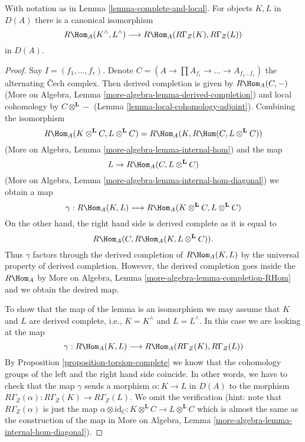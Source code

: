 \begin{lemma}
\label{lemma-compare-RHom}
With notation as in Lemma \ref{lemma-complete-and-local}.
For objects $K, L$ in $D(A)$ there is a canonical isomorphism
$$
R\Hom_A(K^\wedge, L^\wedge) \longrightarrow R\Hom_A(R\Gamma_Z(K), R\Gamma_Z(L))
$$
in $D(A)$.
\end{lemma}

\begin{proof}
Say $I = (f_1, \ldots, f_r)$. Denote
$C = (A \to \prod A_{f_i} \to \ldots \to A_{f_1 \ldots f_r})$ the
alternating {\v C}ech complex. Then derived completion is given by
$R\Hom_A(C, -)$ (More on Algebra, Lemma
\ref{more-algebra-lemma-derived-completion}) and local cohomology by
$C \otimes^\mathbf{L} -$ (Lemma \ref{lemma-local-cohomology-adjoint}).
Combining the isomorphism
$$
R\Hom_A(K \otimes^\mathbf{L} C, L \otimes^\mathbf{L} C) =
R\Hom_A(K, R\Hom(C,  L \otimes^\mathbf{L} C))
$$
(More on Algebra, Lemma \ref{more-algebra-lemma-internal-hom})
and the map
$$
L \to R\Hom_A(C,  L \otimes^\mathbf{L} C)
$$
(More on Algebra, Lemma \ref{more-algebra-lemma-internal-hom-diagonal})
we obtain a map
$$
\gamma :
R\Hom_A(K, L)
\longrightarrow
R\Hom_A(K \otimes^\mathbf{L} C, L \otimes^\mathbf{L} C)
$$
On the other hand, the right hand side is derived complete as it is
equal to
$$
R\Hom_A(C, R\Hom_A(K, L \otimes^\mathbf{L} C)).
$$
Thus $\gamma$ factors through the derived completion of
$R\Hom_A(K, L)$ by the universal property of derived completion.
However, the derived completion goes inside the $R\Hom_A$ by
More on Algebra, Lemma \ref{more-algebra-lemma-completion-RHom}
and we obtain the desired map.

\medskip\noindent
To show that the map of the lemma is an isomorphism
we may assume that $K$ and $L$ are derived complete, i.e.,
$K = K^\wedge$ and $L = L^\wedge$. In this case we are
looking at the map
$$
\gamma : R\Hom_A(K, L) \longrightarrow R\Hom_A(R\Gamma_Z(K), R\Gamma_Z(L))
$$
By Proposition \ref{proposition-torsion-complete} we know that
the cohomology groups
of the left and the right hand side coincide. In other words,
we have to check that the map $\gamma$ sends a morphism
$\alpha : K \to L$ in $D(A)$ to the morphism
$R\Gamma_Z(\alpha) : R\Gamma_Z(K) \to R\Gamma_Z(L)$.
We omit the verification (hint: note that $R\Gamma_Z(\alpha)$
is just the map
$\alpha \otimes \text{id}_C :
K \otimes^\mathbf{L} C
\to
L \otimes^\mathbf{L} C$ which is almost the same as the
construction of the map in
More on Algebra, Lemma \ref{more-algebra-lemma-internal-hom-diagonal}).
\end{proof}






